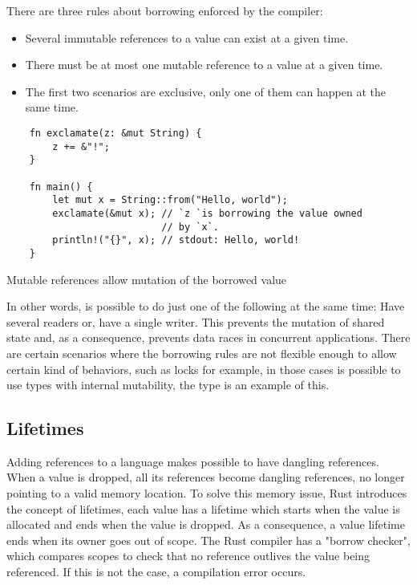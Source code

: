 There are three rules about borrowing enforced by the compiler:
\begin{itemize}
    \item Several immutable references to a value can exist at a given time.
    \item There must be at most one mutable reference to a value at a given time.
    \item The first two scenarios are exclusive, only one of them can happen at the same time.
\end{itemize}

\begin{listing}[ht]
	\begin{verbatim}
    fn exclamate(z: &mut String) {
        z += &"!";    
    }

    fn main() {
        let mut x = String::from("Hello, world");
        exclamate(&mut x); // `z `is borrowing the value owned 
                           // by `x`.
        println!("{}", x); // stdout: Hello, world!
    }
	\end{verbatim}
  \caption{Mutable references allow mutation of the borrowed value}
  \label{lst:mutable_ref}
\end{listing}

In other words, is possible to do just one of the following at the same time:
Have several readers or, have a single writer. This prevents the mutation of
shared state and, as a consequence, prevents data races in concurrent
applications. There are certain scenarios where the borrowing rules are not
flexible enough to allow certain kind of behaviors, such as locks for example,
in those cases is possible to use types with internal mutability, the
 type is an example of this.

\subsection{Lifetimes}

Adding references to a language makes possible to have dangling references. When
a value is dropped, all its references become dangling references, no longer
pointing to a valid memory location. To solve this memory issue, Rust introduces
the concept of lifetimes, each value has a lifetime which starts when the value
is allocated and ends when the value is dropped. As a consequence, a value
lifetime ends when its owner goes out of scope. The Rust compiler has a "borrow
checker", which compares scopes to check that no reference outlives the value
being referenced. If this is not the case, a compilation error occurs.


